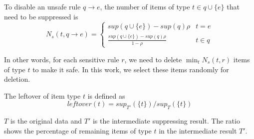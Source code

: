 \begin{definition}
\label{minimum}
To disable an unsafe rule $q \rightarrow e$, the number of items of type
$t \in q\cup\{e\}$ that need to be suppressed is
\[N_s(t, q\rightarrow e)=
\begin{cases}
sup(q\cup \{e\})-sup(q)\rho & t=e  \\
\frac{sup(q\cup \{e\})-sup(q)\rho}{1-\rho} & t\in q %
\end{cases} \]
\end{definition}

In other words, for each sensitive rule $r$, 
we need to delete $\min_t N_s(t, r)$ items of type $t$ to make it safe. 
In this work, we select these items randomly for deletion.

\begin{definition}
 The leftover of item type $t$ is defined as
 \vspace{-1mm}
\[ leftover(t)={sup_{T'}(\{t\})}/{sup_T(\{t\})} \]
\end{definition}
$T$ is the original data and $T'$ is the intermediate suppressing result.
The ratio shows the percentage of remaining items of type $t$
in the intermediate result $T'$.


